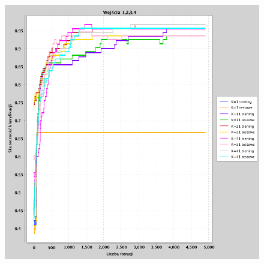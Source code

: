 \documentclass[a4paper, portrait,11pt]{article}
\begin{document}
\begin{figure}[!htb]
\begin{minipage}{0.33\textwidth}
    \caption{\label{fig:41_3_2,3,4}}
  \end{minipage}
  \begin{minipage}{0.33\textwidth}
    \centering
    \includegraphics[width=1\linewidth]{../data/classification4/1/4_1,2,3,4.png}
    \caption{\label{fig:41_4_1,2,3,4}}
  \end{minipage}\hfill
\end{figure}

\end{document}
